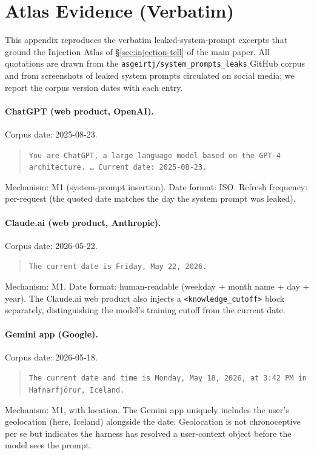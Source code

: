 
\section{Atlas Evidence (Verbatim)}
\label{app:atlas-evidence}

This appendix reproduces the verbatim leaked-system-prompt excerpts that ground the Injection Atlas of \S\ref{sec:injection-tell} of the main paper. All quotations are drawn from the \texttt{asgeirtj/system\_prompts\_leaks} GitHub corpus and from screenshots of leaked system prompts circulated on social media; we report the corpus version dates with each entry.

\paragraph{ChatGPT (web product, OpenAI).}
Corpus date: 2025-08-23.
\begin{quote}
\texttt{You are ChatGPT, a large language model based on the GPT-4 architecture. \ldots\ Current date: 2025-08-23.}
\end{quote}
Mechanism: M1 (system-prompt insertion). Date format: ISO. Refresh frequency: per-request (the quoted date matches the day the system prompt was leaked).

\paragraph{Claude.ai (web product, Anthropic).}
Corpus date: 2026-05-22.
\begin{quote}
\texttt{The current date is Friday, May 22, 2026.}
\end{quote}
Mechanism: M1. Date format: human-readable (weekday + month name + day + year). The Claude.ai web product also injects a \texttt{<knowledge\_cutoff>} block separately, distinguishing the model's training cutoff from the current date.

\paragraph{Gemini app (Google).}
Corpus date: 2026-05-18.
\begin{quote}
\texttt{The current date and time is Monday, May 18, 2026, at 3:42 PM in Hafnarfj\"or\dh ur, Iceland.}
\end{quote}
Mechanism: M1, with location. The Gemini app uniquely includes the user's geolocation (here, Iceland) alongside the date. Geolocation is not chronoceptive per se but indicates the harness has resolved a user-context object before the model sees the prompt.

